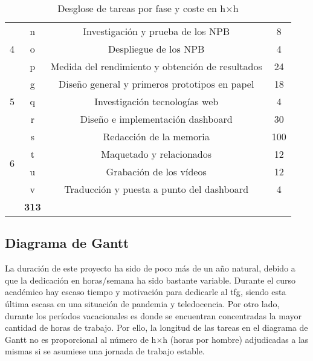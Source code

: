 \begin{table}[htpb]
\begin{tabular}{ |c|c|c|c| }
  \multirow{3}{*}{4}        & n     & {Investigación y prueba de los NPB}                                       & 8 \\\cline{2-4}
                            & o     & {Despliegue de los NPB}                                                  & 4 \\\cline{2-4}
                            & p     & {Medida del rendimiento y obtención de resultados}                        & 24 \\
  \hline
  \multirow{3}{*}{5}        & g     & {Diseño general y primeros prototipos en papel}                           & 18 \\\cline{2-4}
                            & q     & {Investigación tecnologías web}                                           & 4 \\\cline{2-4}
                            & r     & {Diseño e implementación dashboard}                                       & 30 \\
  \hline
  \multirow{4}{*}{6}        & s     & {Redacción de la memoria}                                                 & 100 \\\cline{2-4}
                            & t     & {Maquetado y relacionados}                                                & 12 \\\cline{2-4}
                            & u     & {Grabación de los vídeos}                                                 & 12 \\\cline{2-4}
                            & v     & {Traducción y puesta a punto del dashboard}                               & 4 \\
  \hhline{|=|=|=|=|}
  \multicolumn{3}{|c|}{\textbf{Total}}                                                                          & \textbf{313}\\
  \hline
  \end{tabular}
  \caption{Desglose de tareas por fase y coste en h$\times$h}
  \label{tab:desglose_de_tareas}
\end{table}

\subsection{Diagrama de Gantt}
La duración de este proyecto ha sido de poco más de un año natural, debido a que la dedicación en horas/semana ha sido bastante variable. Durante el curso académico hay escaso tiempo y motivación para dedicarle al \acrshort{tfg}, siendo esta última escasa en una situación de pandemia y teledocencia. Por otro lado, durante los períodos vacacionales es donde se encuentran concentradas la mayor cantidad de horas de trabajo. Por ello, la longitud de las tareas en el diagrama de Gantt no es proporcional al número de h$\times$h (horas por hombre) adjudicadas a las mismas si se asumiese una jornada de trabajo estable.


